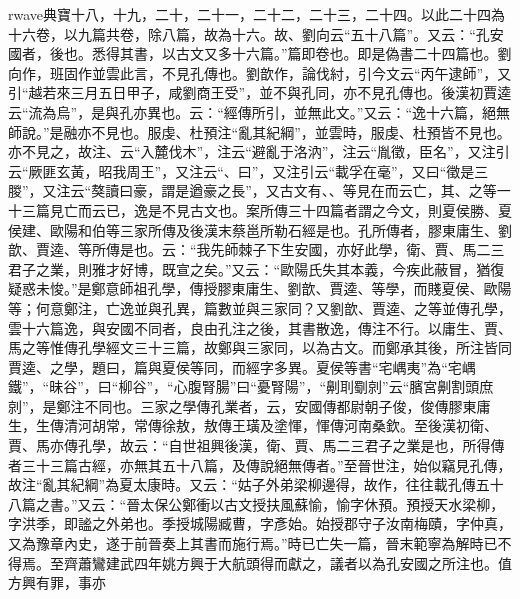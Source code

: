 rwave{典寶}十八，十九，二十，二十一，二十二，二十三，二十四。以此二十四為十六卷，以九篇共卷，除八篇，故為十六。故、劉向云“五十八篇”。又云：“孔安國者，後也。悉得其書，以古文又多十六篇。”篇即卷也。即是偽書二十四篇也。劉向作，班固作並雲此言，不見孔傳也。劉歆作，論伐紂，引今文云“丙午逮師”，又引“越若來三月五日甲子，咸劉商王受”，並不與孔同，亦不見孔傳也。後漢初賈逵云“流為烏”，是與孔亦異也。云：“經傳所引，並無此文。”又云：“逸十六篇，絕無師說。”是融亦不見也。服虔、杜預注“亂其紀綱”，並雲時，服虔、杜預皆不見也。亦不見之，故注、云“入麓伐木”，注云“避亂于洛汭”，注云“胤徵，臣名”，又注引云“厥匪玄黃，昭我周王”，又注云“、曰”，又注引云“載孚在毫”，又曰“徵是三朡”，又注云“獒讀曰豪，謂是遒豪之長”，又古文有、、等見在而云亡，其、之等一十三篇見亡而云已，逸是不見古文也。案所傳三十四篇者謂之今文，則夏侯勝、夏侯建、歐陽和伯等三家所傳及後漢末蔡邕所勒石經是也。孔所傳者，膠東庸生、劉歆、賈逵、等所傳是也。云：“我先師棘子下生安國，亦好此學，衛、賈、馬二三君子之業，則雅才好博，既宣之矣。”又云：“歐陽氏失其本義，今疾此蔽冒，猶復疑惑未悛。”是鄭意師祖孔學，傳授膠東庸生、劉歆、賈逵、等學，而賤夏侯、歐陽等；何意鄭注，亡逸並與孔異，篇數並與三家同？又劉歆、賈逵、之等並傳孔學，雲十六篇逸，與安國不同者，良由孔注之後，其書散逸，傳注不行。以庸生、賈、馬之等惟傳孔學經文三十三篇，故鄭與三家同，以為古文。而鄭承其後，所注皆同賈逵、之學，題曰，篇與夏侯等同，而經字多異。夏侯等書“宅嵎夷”為“宅嵎鐵”，“昧谷”，曰“柳谷”，“心腹腎腸”曰“憂腎陽”，“劓刵劅剠”云“臏宮劓割頭庶剠”，是鄭注不同也。三家之學傳孔業者，云，安國傳都尉朝子俊，俊傳膠東庸生，生傳清河胡常，常傳徐敖，敖傳王璜及塗惲，惲傳河南桑欽。至後漢初衛、賈、馬亦傳孔學，故云：“自世祖興後漢，衛、賈、馬二三君子之業是也，所得傳者三十三篇古經，亦無其五十八篇，及傳說絕無傳者。”至晉世注，始似竊見孔傳，故注“亂其紀綱”為夏太康時。又云：“姑子外弟梁柳邊得，故作，往往載孔傳五十八篇之書。”又云：“晉太保公鄭衝以古文授扶風蘇愉，愉字休預。預授天水梁柳，字洪季，即謐之外弟也。季授城陽臧曹，字彥始。始授郡守子汝南梅賾，字仲真，又為豫章內史，遂于前晉奏上其書而施行焉。”時已亡失一篇，晉末範寧為解時已不得焉。至齊蕭鸞建武四年姚方興于大航頭得而獻之，議者以為孔安國之所注也。值方興有罪，事亦